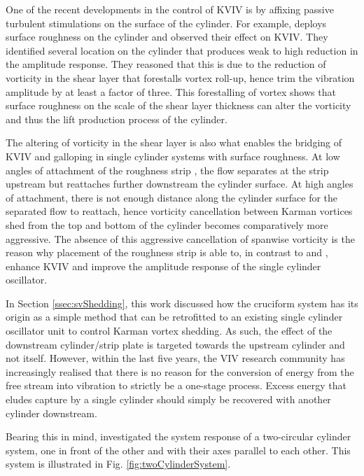 \documentclass[oneside]{utmthesis}
\begin{document}
One of the recent developments in the control of KVIV is by affixing passive turbulent stimulations on the surface of the cylinder. For example, \citet{Park2016} deploys surface roughness on the cylinder and observed their effect on KVIV. They identified several location on the cylinder that produces weak to high reduction in the amplitude response. They reasoned that this is due to the reduction of vorticity in the shear layer that forestalls vortex roll-up, hence trim the vibration amplitude by at least a factor of three. This forestalling of vortex shows that surface roughness on the scale of the shear layer thickness can alter the vorticity and thus the lift production process of the cylinder.

The altering of vorticity in the shear layer is also what enables the bridging of KVIV and galloping in single cylinder systems with surface roughness. At low angles of attachment of the roughness strip \citep{Park2013}, the flow separates at the strip upstream but reattaches further downstream the cylinder surface. At high angles of attachment, there is not enough distance along the cylinder surface for the separated flow to reattach, hence vorticity cancellation between Karman vortices shed from the top and bottom of the cylinder becomes comparatively more aggressive. The absence of this aggressive cancellation of spanwise vorticity is the reason why placement of the roughness strip is able to, in contrast to \citet{Bernitsas2008c} and \citet{Park2016}, enhance KVIV and improve the amplitude response of the single cylinder oscillator.

In Section \ref{ssec:svShedding}, this work discussed how the cruciform system has its origin as a simple method that can be retrofitted to an existing single cylinder oscillator unit to control Karman vortex shedding. As such, the effect of the downstream cylinder/strip plate is targeted towards the upstream cylinder and not itself. However, within the last five years, the VIV research community has increasingly realised that there is no reason for the conversion of energy from the free stream into vibration to strictly be a one-stage process. Excess energy that eludes capture by a single cylinder should simply be recovered with another cylinder downstream.

Bearing this in mind, \citet{Ding2017} investigated the system response of a two-circular cylinder system, one in front of the other and with their axes parallel to each other. This system is illustrated in Fig. \ref{fig:twoCylinderSystem}.
\end{document}

